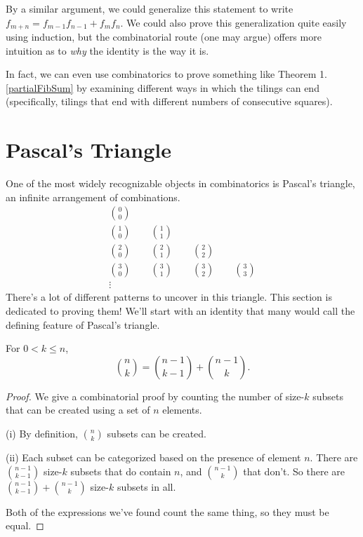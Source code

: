 \documentclass[../m055main.tex]{subfiles}
\begin{document}
By a similar argument, we could generalize this statement to write $f_{m+n} = f_{m-1} f_{n-1} + f_m f_n$.
We could also prove this generalization quite easily using induction, but the combinatorial route (one may argue) offers more intuition as to \textit{why} the identity is the way it is.

In fact, we can even use combinatorics to prove something like Theorem 1.\ref{partialFibSum} by examining different ways in which the tilings can end (specifically, tilings that end with different numbers of consecutive squares).

\section{Pascal's Triangle}
One of the most widely recognizable objects in combinatorics is Pascal's triangle, an infinite arrangement of combinations.
\begin{gather*}
    \binom{0}{0} \\
    \binom{1}{0} \qquad \binom{1}{1} \\
    \binom{2}{0} \qquad \binom{2}{1} \qquad \binom{2}{2} \\
    \binom{3}{0} \qquad \binom{3}{1} \qquad \binom{3}{2} \qquad \binom{3}{3} \\
    \vdots
\end{gather*}
There's a lot of different patterns to uncover in this triangle.
This section is dedicated to proving them!
We'll start with an identity that many would call the defining feature of Pascal's triangle.

\begin{theorem}
    For $0 < k \leq n$,
    \[ \binom{n}{k} = \binom{n-1}{k-1} + \binom{n-1}{k}. \]
\end{theorem}

\begin{proof}
    We give a combinatorial proof by counting the number of size-$k$ subsets that can be created using a set of $n$ elements.
    \smallskip

    (i) By definition, $\binom{n}{k}$ subsets can be created.
    \smallskip

    (ii) Each subset can be categorized based on the presence of element $n$.
    There are $\binom{n-1}{k-1}$ size-$k$ subsets that do contain $n$, and $\binom{n-1}{k}$ that don't.
    So there are $\binom{n-1}{k-1} + \binom{n-1}{k}$ size-$k$ subsets in all.
    \smallskip

    Both of the expressions we've found count the same thing, so they must be equal.
\end{proof}
\end{document}
